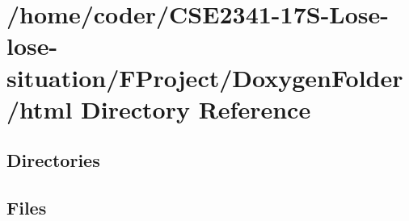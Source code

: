 \section{/home/coder/\+C\+S\+E2341-\/17\+S-\/\+Lose-\/lose-\/situation/\+F\+Project/\+Doxygen\+Folder/html Directory Reference}
\label{dir_deabe37886449192ef6d5c20d5b75d1a}
\subsection*{Directories}
\begin{DoxyCompactItemize}
\end{DoxyCompactItemize}
\subsection*{Files}
\begin{DoxyCompactItemize}
\end{DoxyCompactItemize}
